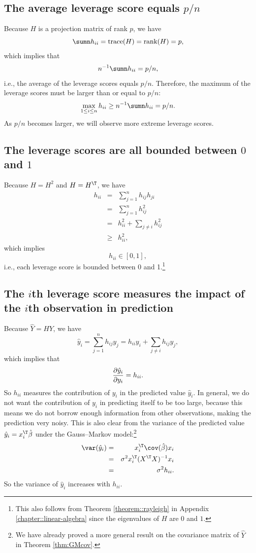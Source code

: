 \subsection{The average leverage score equals $p/n$}

Because $H$ is a projection matrix of rank $p$, we have
\[
\sumn h_{ii}=\text{trace}(H)=\text{rank}(H)=p, 
\]
which implies that
\[
n^{-1}\sumn h_{ii}=p/n, 
\]
i.e., the average of the leverage scores equals $p/n$. Therefore, the maximum of the leverage scores must be larger than or equal to $p/n$:
$$
\max_{1\leq i \leq n} h_{ii} \geq  n^{-1}\sumn h_{ii}=p/n . 
$$
As $p / n$ becomes larger, we will observe more extreme leverage scores. 




\subsection{The  leverage scores are all bounded between $0$ and $1$}


Because $H=H^{2}$ and $H=H^{\T}$, we have
\begin{eqnarray*}
h_{ii} &=& \sum_{j=1}^{n}h_{ij}h_{ji} \\
&=& \sum_{j=1}^{n}h_{ij}^{2} \\
&=& h_{ii}^{2}+\sum_{j\neq i}h_{ij}^{2} \\ 
&\geq & h_{ii}^2  , 
\end{eqnarray*}
which implies 
$$
h_{ii}\in[0,1] , 
$$ 
i.e., each leverage score is bounded between 0 and 1.\footnote{This also follows from Theorem \ref{theorem::rayleigh} in Appendix \ref{chapter::linear-algebra} since the eigenvalues of $H$ are $0$ and $1$.}




\subsection{The $i$th leverage score measures the impact of the $i$th observation in prediction}

Because $\hat{Y}=HY$, we have
\[
\hat{y}_{i}=\sum_{j=1}^{n}h_{ij}y_{j}=h_{ii}y_{i}+\sum_{j\neq i}h_{ij}y_{j},
\]
which implies that
\[
\frac{\text{\ensuremath{\partial\hat{y}_{i}}}}{\partial y_{i}}=h_{ii}.
\]
So $h_{ii}$ measures the contribution of $y_{i}$ in the predicted
value $\hat{y}_{i}.$ In general, we do not want the contribution
of $y_{i}$ in predicting itself to be too large, because this means
we do not borrow enough information from other observations, making
the prediction very noisy. This is also clear from the variance of the predicted value 
$\hat{y}_{i}=x_{i}^{\T}\hat{\beta}$ under the Gauss--Markov model:\footnote{We have already proved a more general result on the covariance matrix of $\hat{Y}$ in Theorem \ref{thm:GMcov}.}
\begin{eqnarray*}
\text{\var}(\hat{y}_{i}) 
&=& x_{i}^{\T}\cov(\hat{\beta})x_{i} \\
&=&\sigma^{2}x_{i}^{\T}(X^{\T}X)^{-1}x_{i} \\
&=&\sigma^{2}h_{ii}.
\end{eqnarray*}
So the variance of $\hat{y}_{i}$ increases with $h_{ii}$.


